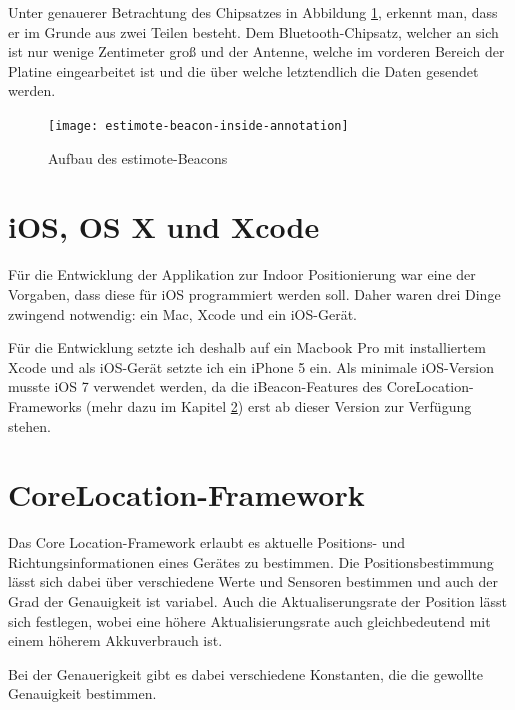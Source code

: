 Unter genauerer Betrachtung des Chipsatzes in Abbildung \ref{estimote-beacon-inside-annotations}, erkennt man, dass er im Grunde aus zwei Teilen besteht.
Dem Bluetooth-Chipsatz, welcher an sich ist nur wenige Zentimeter groß und der Antenne, welche im vorderen Bereich der Platine eingearbeitet ist und die über welche letztendlich die Daten gesendet werden.

\begin{figure}[h!]
	\centering
	\texttt{[image: estimote-beacon-inside-annotation]}
	\caption{Aufbau des estimote-Beacons}
	\label{estimote-beacon-inside-annotations}
\end{figure}



\section{iOS, OS X und Xcode}
\label{sec:technologies:iosandxcode}
Für die Entwicklung der Applikation zur Indoor Positionierung war eine der Vorgaben, dass diese für iOS programmiert werden soll.
Daher waren drei Dinge zwingend notwendig: ein Mac, Xcode und ein iOS-Gerät.

Für die Entwicklung setzte ich deshalb auf ein Macbook Pro mit installiertem Xcode und als iOS-Gerät setzte ich ein iPhone 5 ein.
Als minimale iOS-Version musste iOS 7 verwendet werden, da die iBeacon-Features des CoreLocation-Frameworks (mehr dazu im Kapitel \ref{sec:technologies:corelocation}) erst ab dieser Version zur Verfügung stehen.


\section{CoreLocation-Framework}
\label{sec:technologies:corelocation}
Das Core Location-Framework erlaubt es aktuelle Positions- und Richtungsinformationen eines Gerätes zu bestimmen.
Die Positionsbestimmung lässt sich dabei über verschiedene Werte und Sensoren bestimmen und auch der Grad der Genauigkeit ist variabel.
Auch die Aktualiserungsrate der Position lässt sich festlegen, wobei eine höhere Aktualisierungsrate auch gleichbedeutend mit einem höherem Akkuverbrauch ist.

Bei der Genauerigkeit gibt es dabei verschiedene Konstanten, die die gewollte Genauigkeit bestimmen. 


